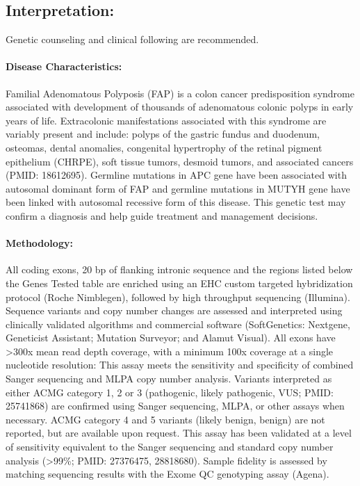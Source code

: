 \documentclass[9pt]{extarticle}
\newcommand{\data}[1]{}
\begin{document}
\subsection*{Interpretation:}
\vspace{-1em}
\data{plugin:long_blurb} 
\newline
Genetic counseling and clinical following are recommended.

\paragraph{Disease Characteristics:} Familial Adenomatous Polyposis (FAP) is a colon cancer predisposition syndrome associated with development of thousands of adenomatous colonic polyps in early years of life. Extracolonic manifestations associated with this syndrome are variably present and include: polyps of the gastric fundus and duodenum, osteomas, dental anomalies, congenital hypertrophy of the retinal pigment epithelium (CHRPE), soft tissue tumors, desmoid tumors, and associated cancers (PMID: 18612695). Germline mutations in APC gene have been associated with autosomal dominant form of FAP and germline mutations in MUTYH gene have been linked with autosomal recessive form of this disease. This genetic test may confirm a diagnosis and help guide treatment and management decisions.

\paragraph{Methodology:} All coding exons, 20 bp of flanking intronic sequence and the regions listed below the Genes Tested table are enriched using an EHC custom targeted hybridization protocol (Roche Nimblegen), followed by high throughput sequencing (Illumina). Sequence variants and copy number changes are assessed and interpreted using clinically validated algorithms and commercial software (SoftGenetics: Nextgene, Geneticist Assistant; Mutation Surveyor; and Alamut Visual). All exons have >300x mean read depth coverage, with a minimum 100x coverage at a single nucleotide resolution: This assay meets the sensitivity and specificity of combined Sanger sequencing and MLPA copy number analysis. Variants interpreted as either ACMG category 1, 2 or 3 (pathogenic, likely pathogenic, VUS; PMID: 25741868) are confirmed using Sanger sequencing, MLPA, or other assays when necessary. ACMG category 4 and 5 variants (likely benign, benign) are not reported, but are available upon request. This assay has been validated at a level of sensitivity equivalent to the Sanger sequencing and standard copy number analysis (>99\%; PMID: 27376475, 28818680). Sample fidelity is assessed by matching sequencing results with the Exome QC genotyping assay (Agena).
\end{document}
